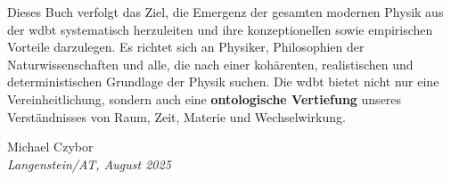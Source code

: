 \documentclass[11pt, a5paper, twoside, openright]{book}
\begin{document}
Dieses Buch verfolgt das Ziel, die Emergenz der gesamten modernen Physik aus der \gls{wdbt} systematisch herzuleiten und ihre konzeptionellen sowie empirischen Vorteile darzulegen. Es richtet sich an
Physiker, Philosophien der Naturwissenschaften und alle, die nach einer kohärenten, realistischen und deterministischen Grundlage der Physik suchen. Die \gls{wdbt} bietet nicht nur eine Vereinheitlichung,
sondern auch eine \textbf{ontologische Vertiefung} unseres Verständnisses von Raum, Zeit, Materie und Wechselwirkung.

\begin{flushright}
    Michael Czybor \\
    \emph{Langenstein/AT, August 2025}
\end{flushright}

\tableofcontents
\listoffigures
\listoftables

\mainmatter






\appendix


\backmatter
\printbibliography[title=Literaturverzeichnis]
\glswritefiles
\printglossary[title=Glossar]
\printglossary[type=acronym, title=Abkürzungen]
\end{document}
